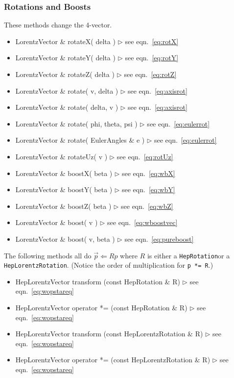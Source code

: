 \documentclass[twoside,12pt]{article}
\def \Ro {{\tt HepRotation}}
\def \LT {{\tt HepLorentzRotation}}
\newcommand {\see}[1] {\hfill$\triangleright$ see eqn.~#1}
\newenvironment{shortlist}{%
\begin{itemize}
\setlength{\itemsep}{0pt}
\setlength{\parskip}{0pt}
}{%
\end{itemize}
}
\begin{document}
\subsubsection{Rotations and Boosts}

These methods change the 4-vector.

\begin{shortlist}
  \item LorentzVector \& rotateX( delta ) \see{\ref{eq:rotX}}
  \item LorentzVector \& rotateY( delta ) \see{\ref{eq:rotY}}
  \item LorentzVector \& rotateZ( delta ) \see{\ref{eq:rotZ}}
  \item LorentzVector \& rotate( v, delta ) \see{\ref{eq:axisrot}}
  \item LorentzVector \& rotate( delta, v ) \see{\ref{eq:axisrot}}
  \item LorentzVector \& rotate( phi, theta, psi ) \see{\ref{eq:eulerrot}}
  \item LorentzVector \& rotate( EulerAngles \& e ) \see{\ref{eq:eulerrot}}
  \item LorentzVector \& rotateUz( v ) \see{\ref{eq:rotUz}}
  \item LorentzVector \& boostX( beta ) \see{\ref{eq:wbX}}
  \item LorentzVector \& boostY( beta ) \see{\ref{eq:wbY}}
  \item LorentzVector \& boostZ( beta ) \see{\ref{eq:wbZ}}
  \item LorentzVector \& boost( v ) \see{\ref{eq:wboostvec}}
  \item LorentzVector \& boost( v, beta ) \see{\ref{eq:pureboost}}
\end{shortlist}


\noindent 
The following methods all do $\vec{p} \Longleftarrow R p$ where $R$ is
either a \Ro or a \LT .
(Notice the order of multiplication for {\tt p *= R}.)

\begin{shortlist}
  \item HepLorentzVector transform   (const HepRotation \& R) 
		\see{\ref{eq:wopstareq}}
  \item HepLorentzVector operator *= (const HepRotation \& R) 
		\see{\ref{eq:wopstareq}}
  \item HepLorentzVector transform   (const HepLorentzRotation \& R) 
		\see{\ref{eq:wopstareq}}
  \item HepLorentzVector operator *= (const HepLorentzRotation \& R) 
		\see{\ref{eq:wopstareq}}
\end{shortlist}
\end{document}
